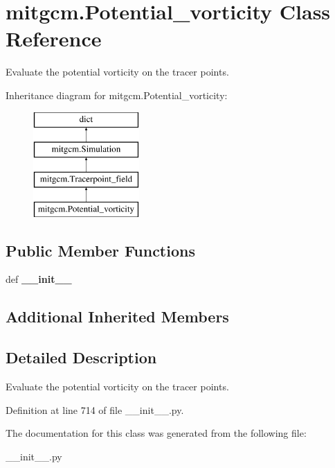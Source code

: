 \hypertarget{classmitgcm_1_1Potential__vorticity}{\section{mitgcm.\+Potential\+\_\+vorticity Class Reference}
\label{classmitgcm_1_1Potential__vorticity}
}


Evaluate the potential vorticity on the tracer points.  


Inheritance diagram for mitgcm.\+Potential\+\_\+vorticity\+:\begin{figure}[H]
\begin{center}
\leavevmode
\includegraphics[height=4.000000cm]{classmitgcm_1_1Potential__vorticity}
\end{center}
\end{figure}
\subsection*{Public Member Functions}
\begin{DoxyCompactItemize}
\item 
\hypertarget{classmitgcm_1_1Potential__vorticity_a5412ecfe6e02d7a6953cf8c2a7dab4cb}{def {\bfseries \+\_\+\+\_\+init\+\_\+\+\_\+}}\label{classmitgcm_1_1Potential__vorticity_a5412ecfe6e02d7a6953cf8c2a7dab4cb}

\end{DoxyCompactItemize}
\subsection*{Additional Inherited Members}


\subsection{Detailed Description}
Evaluate the potential vorticity on the tracer points. 



Definition at line 714 of file \+\_\+\+\_\+init\+\_\+\+\_\+.\+py.



The documentation for this class was generated from the following file\+:\begin{DoxyCompactItemize}
\item 
\+\_\+\+\_\+init\+\_\+\+\_\+.\+py\end{DoxyCompactItemize}
